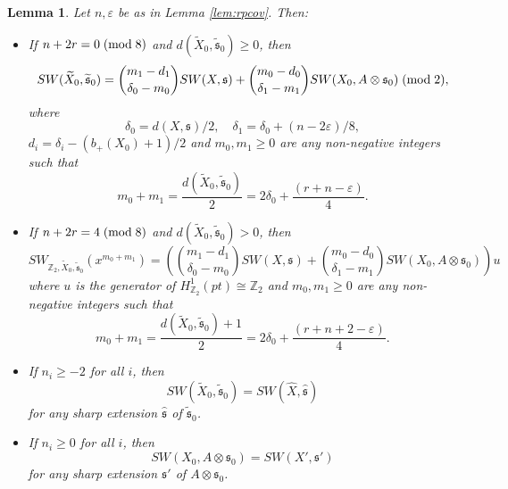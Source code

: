 \documentclass{amsart}
\newtheorem{lemma}[theorem]{Lemma}
\theoremstyle{definition}
\theoremstyle{remark}
\numberwithin{equation}{section}
\begin{document}
\begin{lemma}\label{lem:swrp}
Let $n,\varepsilon$ be as in Lemma \ref{lem:rpcov}. Then:
\begin{itemize}
\item[(1)]{If $n+2r = 0 \; ({\rm mod} \; 8)$ and $d(\widetilde{X}_0 , \widetilde{\mathfrak{s}}_0) \ge 0$, then
\[
SW(\widetilde{X}_0 , \widetilde{\mathfrak{s}}_0) = \binom{m_1-d_1}{\delta_0-m_0}SW(X , \mathfrak{s}) + \binom{m_0-d_0}{\delta_1 - m_1}SW(X_0 , A \otimes \mathfrak{s}_0) \; ({\rm mod} \; 2),
\]
where 
\[
\delta_0 = d(X , \mathfrak{s})/2, \quad \delta_1 = \delta_0 + (n - 2\varepsilon)/8,
\]
$d_i = \delta_i - (b_+(X_0)+1)/2$ and $m_0,m_1 \ge 0$ are any non-negative integers such that 
\[
m_0 + m_1 = \frac{d(\widetilde{X}_0 , \widetilde{\mathfrak{s}}_0)}{2} = 2\delta_0 + \frac{(r+n-\varepsilon)}{4}.
\]
}
\item[(2)]{If $n+2r = 4 \; ({\rm mod} \; 8)$ and $d(\widetilde{X}_0 , \widetilde{\mathfrak{s}}_0) > 0$, then
\[
SW_{\mathbb{Z}_2 , \widetilde{X}_0 , \widetilde{\mathfrak{s}}_0}( x^{m_0+m_1} ) = \left( \binom{m_1-d_1}{\delta_0-m_0}SW(X , \mathfrak{s}) + \binom{m_0-d_0}{\delta_1 - m_1}SW(X_0 , A \otimes \mathfrak{s}_0) \right)u
\]
where $u$ is the generator of $H^1_{\mathbb{Z}_2}(pt) \cong \mathbb{Z}_2$ and $m_0,m_1 \ge 0$ are any non-negative integers such that
\[
m_0 + m_1 = \frac{d(\widetilde{X}_0 , \widetilde{\mathfrak{s}}_0)+1}{2} = 2\delta_0 + \frac{(r+n+2-\varepsilon)}{4}.
\]
}
\item[(3)]{
If $n_i \ge -2$ for all $i$, then
\[
SW(\widetilde{X}_0 , \widetilde{\mathfrak{s}}_0) = SW(\widehat{X} , \widehat{\mathfrak{s}})
\]
for any sharp extension $\widehat{\mathfrak{s}}$ of $\widetilde{\mathfrak{s}}_0$.
}
\item[(4)]{
If $n_i \ge 0$ for all $i$, then
\[
SW(X_0 , A \otimes \mathfrak{s}_0) = SW(X' , \mathfrak{s}')
\]
for any sharp extension $\mathfrak{s}'$ of $A \otimes \mathfrak{s}_0$.
}
\end{itemize}
\end{lemma}
\end{document}

